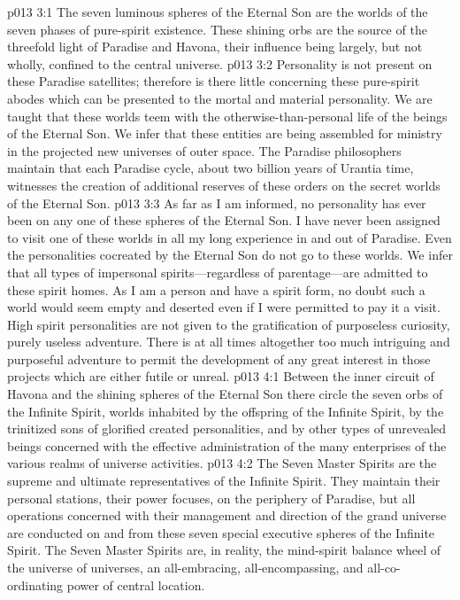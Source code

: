 \vs p013 3:1 The seven luminous spheres of the Eternal Son are the worlds of the seven phases of pure\hyp{}spirit existence. These shining orbs are the source of the threefold light of Paradise and Havona, their influence being largely, but not wholly, confined to the central universe.
\vs p013 3:2 Personality is not present on these Paradise satellites; therefore is there little concerning these pure\hyp{}spirit abodes which can be presented to the mortal and material personality. We are taught that these worlds teem with the otherwise\hyp{}than\hyp{}personal life of the beings of the Eternal Son. We infer that these entities are being assembled for ministry in the projected new universes of outer space. The Paradise philosophers maintain that each Paradise cycle, about two billion years of Urantia time, witnesses the creation of additional reserves of these orders on the secret worlds of the Eternal Son.
\pc \vs p013 3:3 As far as I am informed, no personality has ever been on any one of these spheres of the Eternal Son. I have never been assigned to visit one of these worlds in all my long experience in and out of Paradise. Even the personalities cocreated by the Eternal Son do not go to these worlds. We infer that all types of impersonal spirits---regardless of parentage---are admitted to these spirit homes. As I am a person and have a spirit form, no doubt such a world would seem empty and deserted even if I were permitted to pay it a visit. High spirit personalities are not given to the gratification of purposeless curiosity, purely useless adventure. There is at all times altogether too much intriguing and purposeful adventure to permit the development of any great interest in those projects which are either futile or unreal.\plusone
{}
\vs p013 4:1 Between the inner circuit of Havona and the shining spheres of the Eternal Son there circle the seven orbs of the Infinite Spirit, worlds inhabited by the offspring of the Infinite Spirit, by the trinitized sons of glorified created personalities, and by other types of unrevealed beings concerned with the effective administration of the many enterprises of the various realms of universe activities.
\vs p013 4:2 The Seven Master Spirits are the supreme and ultimate representatives of the Infinite Spirit. They maintain their personal stations, their power focuses, on the periphery of Paradise, but all operations concerned with their management and direction of the grand universe are conducted on and from these seven special executive spheres of the Infinite Spirit. The Seven Master Spirits are, in reality, the mind\hyp{}spirit balance wheel of the universe of universes, an all\hyp{}embracing, all\hyp{}encompassing, and all\hyp{}co\hyp{}ordinating power of central location.
